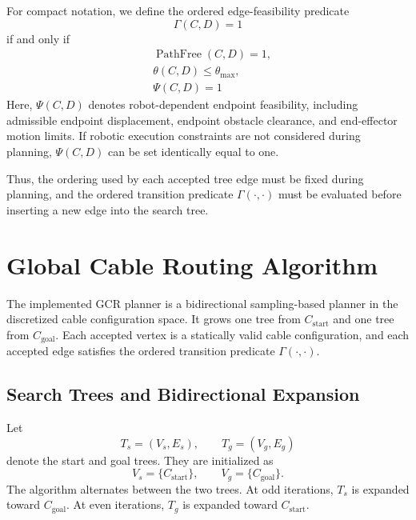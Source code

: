 \documentclass{pas}
\begin{document}
For compact notation, we define the ordered edge-feasibility predicate
\begin{equation}
\Gamma(C,D)=1
\end{equation}
if and only if
\begin{equation}
\begin{aligned}
   & \operatorname{PathFree}(C,D)=1, \\
& \theta(C,D)\leq \theta_{\max}, \\
& \Psi(C,D)=1
\end{aligned}
\end{equation}
Here, $\Psi(C,D)$ denotes robot-dependent endpoint feasibility, including admissible endpoint displacement, endpoint obstacle clearance, and end-effector motion limits. If robotic execution constraints are not considered during planning, $\Psi(C,D)$ can be set identically equal to one.

Thus, the ordering used by each accepted tree edge must be fixed
during planning, and the ordered transition predicate $\Gamma(\cdot,\cdot)$
must be evaluated before inserting a new edge into the search tree.



\section{Global Cable Routing Algorithm}
\label{sec:gcr_algorithm}

The implemented GCR planner is a bidirectional sampling-based planner in the discretized cable configuration space. It grows one tree from \(C_{\mathrm{start}}\) and one tree from \(C_{\mathrm{goal}}\). Each accepted vertex is a statically valid cable configuration, and each accepted edge satisfies the ordered transition predicate \(\Gamma(\cdot,\cdot)\).

\subsection{Search Trees and Bidirectional Expansion}
\label{subsec:gcr_search_trees}

Let
\begin{equation}
T_s=(V_s,E_s),
\qquad
T_g=(V_g,E_g)
\label{eq:gcr_two_trees}
\end{equation}
denote the start and goal trees. They are initialized as
\begin{equation}
V_s=\{C_{\mathrm{start}}\},
\qquad
V_g=\{C_{\mathrm{goal}}\}.
\label{eq:gcr_tree_initialization}
\end{equation}
The algorithm alternates between the two trees. At odd iterations, \(T_s\) is expanded toward \(C_{\mathrm{goal}}\). At even iterations, \(T_g\) is expanded toward \(C_{\mathrm{start}}\).
\end{document}

